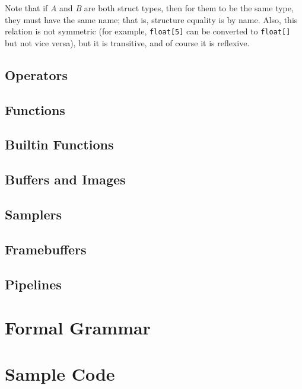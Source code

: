 \documentclass[11pt]{article}
\newcommand{\code}[1]{\texttt{#1}}
\begin{document}
Note that if \textit{A} and \textit{B} are both struct types, then for them to be the same type, they must have the same name; that is, structure  equality is by name. Also, this relation is not symmetric (for example, \code{float[5]} can be converted to \code{float[]} but not vice versa), but it is transitive, and of course it is reflexive.

\subsection{Operators} \label{operators}

\subsection{Functions}

\subsection{Builtin Functions} \label{builtins}

\subsection{Buffers and Images}

\subsection{Samplers}

\subsection{Framebuffers}

\subsection{Pipelines}

\section{Formal Grammar}

\section{Sample Code}
\end{document}

